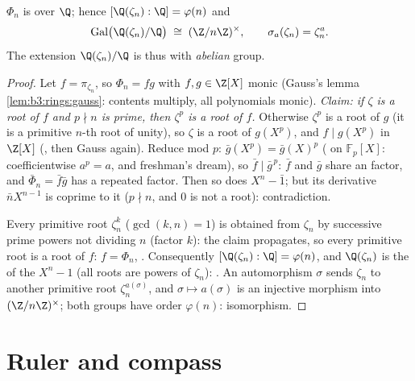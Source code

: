 \begin{theorem}\label{thm:b3:galois:cyclotomicirred}
$\Phi_n$ is  over $\Q$; hence $[\Q(\zeta_n) : \Q] =
\varphi(n)$ and
\[
\operatorname{Gal}\bigl(\Q(\zeta_n)/\Q\bigr) \;\cong\;
(\Z/n\Z)^\times,
\qquad \sigma_a(\zeta_n) = \zeta_n^a .
\]
The extension $\Q(\zeta_n)/\Q$ is thus  with \emph{abelian}
group.
\end{theorem}

\begin{proof}
Let $f = \pi_{\zeta_n}$, so $\Phi_n = fg$ with $f, g \in \Z[X]$
monic (Gauss's lemma \cref{lem:b3:rings:gauss}: contents
multiply, all polynomials monic). \emph{Claim: if $\zeta$ is a
root of $f$ and $p \nmid n$ is prime, then $\zeta^p$ is a root
of $f$.} Otherwise $\zeta^p$ is a root of $g$ (it is a primitive
$n$-th root of unity), so $\zeta$ is a root of $g(X^p)$, and $f
\mid g(X^p)$ in $\Z[X]$ (, then Gauss again).
Reduce mod $p$: $\bar g(X^p) = \bar g(X)^p$ ( on
$\mathbb F_p[X]$: coefficientwise $a^p = a$, and freshman's
dream), so $\bar f \mid \bar g^{\,p}$: $\bar f$ and $\bar g$
share an  factor, and $\bar\Phi_n = \bar f\bar g$ has
a repeated factor. Then so does $X^n - \bar 1$; but its
derivative $\bar nX^{n-1}$ is coprime to it ($p \nmid n$, and
$0$ is not a root): contradiction.

Every primitive root $\zeta_n^k$ ($\gcd(k, n) = 1$) is obtained
from $\zeta_n$ by successive prime powers not dividing $n$
(factor $k$): the claim propagates, so every primitive root is a
root of $f$: $f = \Phi_n$, . Consequently
$[\Q(\zeta_n):\Q] = \varphi(n)$, and $\Q(\zeta_n)$ is the
 of the  $X^n - 1$ (all roots are powers
of $\zeta_n$): . An automorphism $\sigma$ sends $\zeta_n$
to another primitive root $\zeta_n^{a(\sigma)}$, and $\sigma
\mapsto a(\sigma)$ is an injective morphism into
$(\Z/n\Z)^\times$; both groups have order $\varphi(n)$:
isomorphism.
\end{proof}

\section{Ruler and compass}

